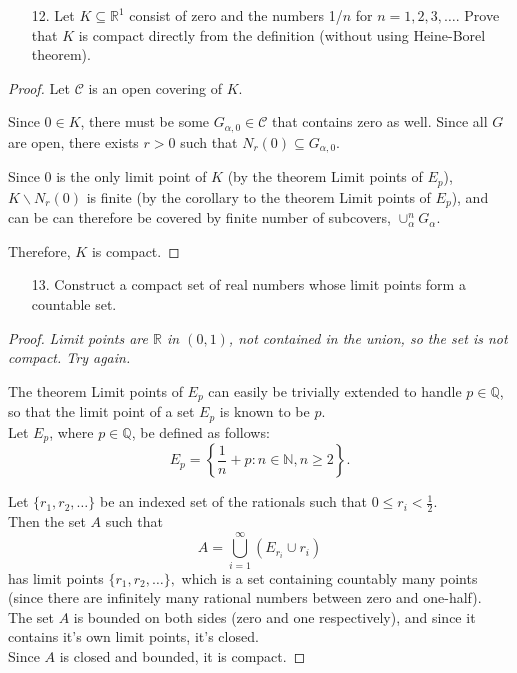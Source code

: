 \documentclass[10pt]{article}
\theoremstyle{definition}
\theoremstyle{plain}
\newcommand{\N}{\mathbb{N}}
\newcommand{\Q}{\mathbb{Q}}
\newcommand{\R}{\mathbb{R}}
\begin{document}
\pagebreak




\begin{enumerate}
\item[12.] Let $K\subseteq \R^1$ consist of zero and the numbers 1/$n$ for $n=1,2,3,\dots.$ Prove that $K$ is compact directly from the definition (without using Heine-Borel theorem).
\end{enumerate}

\begin{proof}
Let $\mathcal{C}$ is an open covering of $K$.

Since $0\in K$, there must be some $G_{\alpha,0} \in\mathcal{C}$ that contains zero as well. Since all $G$ are open, there exists $r>0$ such that $N_r (0)\subseteq G_{\alpha,0}$.

Since 0 is the only limit point of $K$ (by the theorem Limit points of $E_p$), $K\backslash N_r(0)$ is finite (by the corollary to the theorem Limit points of $E_p$), and can be can therefore be covered by finite number of subcovers, $\cup_\alpha^n G_\alpha$.

Therefore, $K$ is compact.
\end{proof}




\pagebreak




\begin{enumerate}
\item[13.] Construct a compact set of real numbers whose limit points form a countable set.
\end{enumerate}

\begin{proof}
\textit{Limit points are $\R$ in $(0,1)$, not contained in the union, so the set is not compact. Try again.}

The theorem Limit points of $E_p$ can easily be trivially extended to handle $p\in\Q$, so that the limit point of a set $E_p$ is known to be $p$. \\

Let $E_p$, where $p\in\Q$, be defined as follows:
$$E_p = \left\{\frac{1}{n} + p: n\in\N, n\geq 2\right\}.$$

Let $\{r_1,r_2,\dots\}$ be an indexed set of the rationals such that $0\leq r_i<\frac{1}{2}$. \\

Then the set $A$ such that
$$A=\bigcup_{i=1}^\infty (E_{r_i} \cup {r_i})$$
has limit points $\{r_1,r_2,\dots\},$ which is a set containing countably many points (since there are infinitely many rational numbers between zero and one-half). \\

The set $A$ is bounded on both sides (zero and one respectively), and since it contains it's own limit points, it's closed.\\

Since $A$ is closed and bounded, it is compact.
\end{proof}
\end{document}
